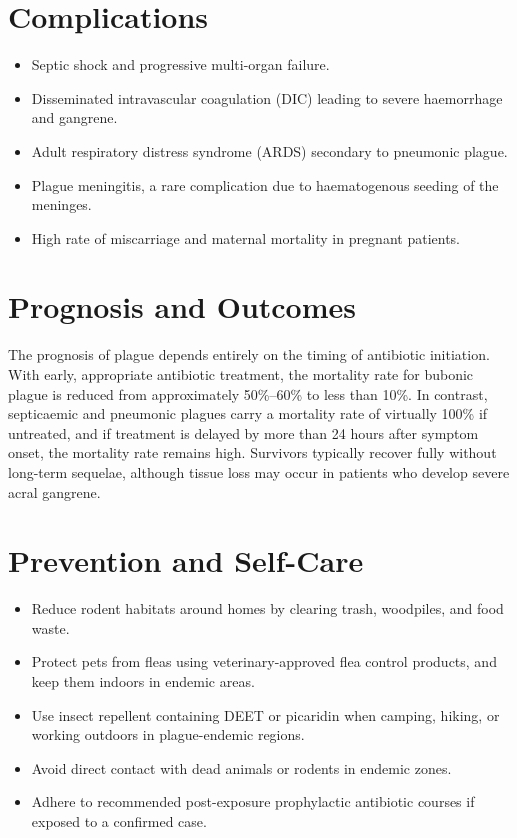 \section*{Complications}
\begin{itemize}
    \item Septic shock and progressive multi-organ failure.
    \item Disseminated intravascular coagulation (DIC) leading to severe haemorrhage and gangrene.
    \item Adult respiratory distress syndrome (ARDS) secondary to pneumonic plague.
    \item Plague meningitis, a rare complication due to haematogenous seeding of the meninges.
    \item High rate of miscarriage and maternal mortality in pregnant patients.
\end{itemize}

\section*{Prognosis and Outcomes}
The prognosis of plague depends entirely on the timing of antibiotic initiation. With early, appropriate antibiotic treatment, the mortality rate for bubonic plague is reduced from approximately 50\%--60\% to less than 10\%. In contrast, septicaemic and pneumonic plagues carry a mortality rate of virtually 100\% if untreated, and if treatment is delayed by more than 24 hours after symptom onset, the mortality rate remains high. Survivors typically recover fully without long-term sequelae, although tissue loss may occur in patients who develop severe acral gangrene.

\section*{Prevention and Self-Care}
\begin{itemize}
    \item Reduce rodent habitats around homes by clearing trash, woodpiles, and food waste.
    \item Protect pets from fleas using veterinary-approved flea control products, and keep them indoors in endemic areas.
    \item Use insect repellent containing DEET or picaridin when camping, hiking, or working outdoors in plague-endemic regions.
    \item Avoid direct contact with dead animals or rodents in endemic zones.
    \item Adhere to recommended post-exposure prophylactic antibiotic courses if exposed to a confirmed case.
\end{itemize}

